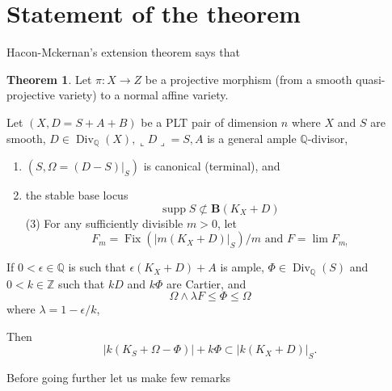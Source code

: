 \documentclass[11pt]{article}
\theoremstyle{definition}
\newtheorem{theorem}{Theorem}[section]
\begin{document}
	\section{Statement of the theorem}
	Hacon-Mckernan's extension theorem says that 
	\begin{theorem}
		
		Let $\pi: X \rightarrow Z$ be a projective morphism (from a smooth quasi-projective variety) to a normal affine variety. 
		
		Let $(X, D=S+A+B)$ be a PLT pair of dimension $n$ where $X$ and $S$ are smooth, $D \in \operatorname{Div}_{\mathbb{Q}}(X),\llcorner D\lrcorner=S, A$ is a general ample $\mathbb{Q}$-divisor,
		
		\begin{enumerate}
			\item $\left(S, \Omega=\left.(D-S)\right|_S\right)$ is canonical (terminal), and
			\item the stable base locus $$\operatorname{supp}S \not \subset \mathbf{B}(K_X+D)$$(3) For any sufficiently divisible $m>0$, let
			$$
			F_m=\operatorname{Fix}\left(\left|m\left(K_X+D\right)\right|_S\right) / m
			\text{ and } F=\lim F_{m_!}$$
		\end{enumerate}
		
		If $0<\epsilon \in \mathbb{Q}$ is such that $\epsilon\left(K_X+D\right)+A$ is ample, $\Phi \in \operatorname{Div}_{\mathbb{Q}}(S)$ and $0<k \in \mathbb{Z}$ such that $k D$ and $k \Phi$ are Cartier, and $$\Omega \wedge \lambda F \leq \Phi \leq \Omega$$where $\lambda=1-\epsilon / k$,
		
		Then
		$$
		\left|k\left(K_S+\Omega-\Phi\right)\right|+k \Phi \subset\left|k\left(K_X+D\right)\right|_S .
		$$
		
	\end{theorem}
	Before going further let us make few remarks
\end{document}
